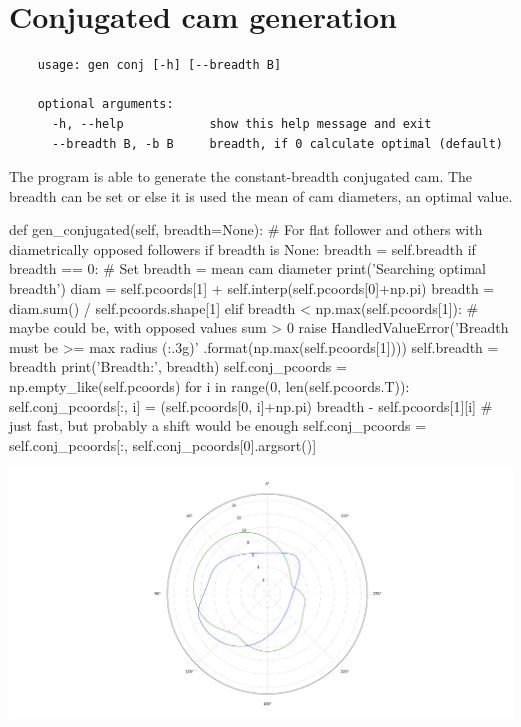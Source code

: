 \documentclass[a4paper,10pt,twoside]{article}
\begin{document}
\section{Conjugated cam generation}
    \begin{verbatim}
    usage: gen conj [-h] [--breadth B]

    optional arguments:
      -h, --help            show this help message and exit
      --breadth B, -b B     breadth, if 0 calculate optimal (default)
    \end{verbatim}
The program is able to generate the constant-breadth conjugated cam. The breadth can be set or else it is used
the mean of cam diameters, an optimal value.
    \begin{pycode}
    def gen_conjugated(self, breadth=None):
        # For flat follower and others with diametrically opposed followers
        if breadth is None:
            breadth = self.breadth
        if breadth == 0:
            # Set breadth = mean cam diameter
            print('Searching optimal breadth')
            diam = self.pcoords[1] + self.interp(self.pcoords[0]+np.pi)
            breadth = diam.sum() / self.pcoords.shape[1]
        elif breadth < np.max(self.pcoords[1]):
            # maybe could be, with opposed values sum > 0
            raise HandledValueError('Breadth must be >= max radius ({:.3g})'
                                    .format(np.max(self.pcoords[1])))
        self.breadth = breadth
        print('Breadth:', breadth)
        self.conj_pcoords = np.empty_like(self.pcoords)
        for i in range(0, len(self.pcoords.T)):
            self.conj_pcoords[:, i] = (self.pcoords[0, i]+np.pi) %
                                       breadth - self.pcoords[1][i]
        # just fast, but probably a shift would be enough
        self.conj_pcoords = self.conj_pcoords[:, self.conj_pcoords[0].argsort()]
    \end{pycode}

    \includegraphics[width=\textwidth]{conj.png}
\end{document}
